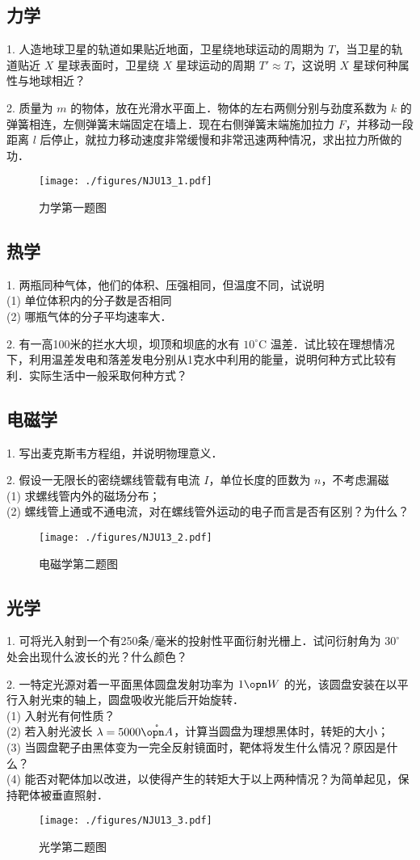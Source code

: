 \subsection{力学}
1. 人造地球卫星的轨道如果贴近地面，卫星绕地球运动的周期为 $T$，当卫星的轨道贴近 $X$ 星球表面时，卫星绕 $X$ 星球运动的周期 $T' \approx T$，这说明 $X$ 星球何种属性与地球相近？

2. 质量为 $m$ 的物体，放在光滑水平面上．物体的左右两侧分别与劲度系数为 $k$ 的弹簧相连，左侧弹簧末端固定在墙上．现在右侧弹簧末端施加拉力 $F$，并移动一段距离 $l$ 后停止，就拉力移动速度非常缓慢和非常迅速两种情况，求出拉力所做的功．
\begin{figure}[ht]
\centering
\texttt{[image: ./figures/NJU13\_1.pdf]}
\caption{力学第一题图} \label{NJU13_fig1}
\end{figure}
\subsection{热学}
1. 两瓶同种气体，他们的体积、压强相同，但温度不同，试说明\\
(1) 单位体积内的分子数是否相同\\
(2) 哪瓶气体的分子平均速率大．

2. 有一高100米的拦水大坝，坝顶和坝底的水有 $10^\circ\mathrm{C}$ 温差．试比较在理想情况下，利用温差发电和落差发电分别从1克水中利用的能量，说明何种方式比较有利．实际生活中一般采取何种方式？
\subsection{电磁学}
1. 写出麦克斯韦方程组，并说明物理意义．

2. 假设一无限长的密绕螺线管载有电流 $I$，单位长度的匝数为 $n$，不考虑漏磁\\
(1) 求螺线管内外的磁场分布；\\
(2) 螺线管上通或不通电流，对在螺线管外运动的电子而言是否有区别？为什么？
\begin{figure}[ht]
\centering
\texttt{[image: ./figures/NJU13\_2.pdf]}
\caption{电磁学第二题图} \label{NJU13_fig2}
\end{figure}
\subsection{光学}
1. 可将光入射到一个有250条/毫米的投射性平面衍射光栅上．试问衍射角为 $30^\circ$ 处会出现什么波长的光？什么颜色？

2. 一特定光源对着一平面黑体圆盘发射功率为 $1\opn W$ 的光，该圆盘安装在以平行入射光束的轴上，圆盘吸收光能后开始旋转．\\
(1) 入射光有何性质？\\
(2) 若入射光波长 $\lambda=5000 \mathring{\opn A}$，计算当圆盘为理想黑体时，转矩的大小；\\
(3) 当圆盘靶子由黑体变为一完全反射镜面时，靶体将发生什么情况？原因是什么？\\
(4) 能否对靶体加以改进，以使得产生的转矩大于以上两种情况？为简单起见，保持靶体被垂直照射．
\begin{figure}[ht]
\centering
\texttt{[image: ./figures/NJU13\_3.pdf]}
\caption{光学第二题图} \label{NJU13_fig3}
\end{figure}
